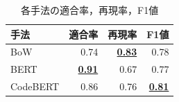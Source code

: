 \documentclass[submit]{ipsj}
\begin{document}
\begin{table}[t]
  \centering
  \caption{各手法の適合率，再現率，F1値}
    \begin{tabular}{l|r|r|r}\hline\hline
    手法 & 適合率 & 再現率 & F1値 \\\hline
    BoW & 0.74 & \underline{\textbf{0.83}} & 0.78 \\
    BERT  & \underline{\textbf{0.91}} & 0.67 & 0.77 \\
    CodeBERT & 0.86 & 0.76 & \underline{\textbf{0.81}} \\\hline
    \end{tabular}
  \label{tab:performance_metrics}
\end{table}





%
\end{document}
